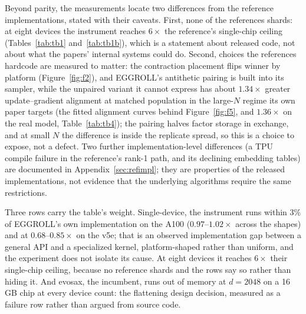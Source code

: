 Beyond parity, the measurements locate two differences from the reference
implementations, stated with their caveats. First, none of the references
shards: at eight devices the instrument reaches
$6\times$ the reference's single-chip ceiling
(Tables~\ref{tab:tb1} and~\ref{tab:tb1b}), which
is a statement about released code, not about what the papers' internal
systems could do. Second, choices the references hardcode are measured to
matter: the contraction placement flips winner by platform
(Figure~\ref{fig:f2}), and EGGROLL's antithetic pairing is built into its
sampler, while the unpaired variant it cannot express has about $1.34\times$
greater update--gradient alignment at matched population in the large-$N$
regime its own paper targets (the fitted alignment curves behind
Figure~\ref{fig:f5}, and $1.36\times$ on the real model,
Table~\ref{tab:tb4}); the pairing halves factor storage in exchange, and at
small $N$ the difference is inside the replicate spread, so this is a choice to expose, not
a defect. Two further implementation-level differences (a TPU compile
failure in the reference's rank-1 path, and its declining embedding
tables) are documented in Appendix~\ref{sec:refimpl}; they are
properties of the released implementations, not evidence that the
underlying algorithms require the same restrictions.

Three rows carry the table's weight. Single-device, the instrument runs
within 3\% of EGGROLL's own implementation on the A100
($0.97$--$1.02\times$ across the shapes) and at $0.68$--$0.85\times$ on
the v5e; that is an observed implementation gap between a general API and
a specialized kernel, platform-shaped rather than uniform, and the
experiment does not isolate its cause. At eight
devices it reaches $6\times$ their single-chip ceiling, because no
reference shards and the rows say so rather than hiding it. And evosax, the
incumbent, runs out of memory at $d{=}2048$ on a 16\,GB chip at every
device count: the flattening design decision, measured as a failure row
rather than argued from source code.

